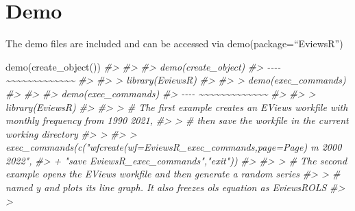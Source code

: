 \documentclass[
]{article}
\newenvironment{Shaded}{\begin{snugshade}}{\end{snugshade}}
\newcommand{\CommentTok}[1]{\textcolor[rgb]{0.56,0.35,0.01}{\textit{#1}}}
\newcommand{\FunctionTok}[1]{\textcolor[rgb]{0.00,0.00,0.00}{#1}}
\newcommand{\NormalTok}[1]{#1}
\begin{document}
\hypertarget{demo}{%
\section{Demo}\label{demo}}

The demo files are included and can be accessed via demo(package=``EviewsR'')

\begin{Shaded}
\begin{Highlighting}[]
\FunctionTok{demo}\NormalTok{(}\FunctionTok{create\_object}\NormalTok{())}
\CommentTok{\#\textgreater{} }
\CommentTok{\#\textgreater{} }
\CommentTok{\#\textgreater{}  demo(create\_object)}
\CommentTok{\#\textgreater{}  {-}{-}{-}{-} \textasciitilde{}\textasciitilde{}\textasciitilde{}\textasciitilde{}\textasciitilde{}\textasciitilde{}\textasciitilde{}\textasciitilde{}\textasciitilde{}\textasciitilde{}\textasciitilde{}\textasciitilde{}\textasciitilde{}}
\CommentTok{\#\textgreater{} }
\CommentTok{\#\textgreater{} \textgreater{} library(EviewsR)}
\CommentTok{\#\textgreater{} }
\CommentTok{\#\textgreater{} \textgreater{} demo(exec\_commands)}
\CommentTok{\#\textgreater{} }
\CommentTok{\#\textgreater{} }
\CommentTok{\#\textgreater{}  demo(exec\_commands)}
\CommentTok{\#\textgreater{}  {-}{-}{-}{-} \textasciitilde{}\textasciitilde{}\textasciitilde{}\textasciitilde{}\textasciitilde{}\textasciitilde{}\textasciitilde{}\textasciitilde{}\textasciitilde{}\textasciitilde{}\textasciitilde{}\textasciitilde{}\textasciitilde{}}
\CommentTok{\#\textgreater{} }
\CommentTok{\#\textgreater{} \textgreater{} library(EviewsR)}
\CommentTok{\#\textgreater{} }
\CommentTok{\#\textgreater{} \textgreater{} \# The first example creates an \textasciigrave{}EViews\textasciigrave{} workfile with monthly frequency from 1990 2021,}
\CommentTok{\#\textgreater{} \textgreater{} \# then save the workfile in the current working directory}
\CommentTok{\#\textgreater{} \textgreater{} }
\CommentTok{\#\textgreater{} \textgreater{} exec\_commands(c("wfcreate(wf=EviewsR\_exec\_commands,page=Page) m 2000 2022",}
\CommentTok{\#\textgreater{} +                 "save EviewsR\_exec\_commands","exit"))}
\CommentTok{\#\textgreater{} }
\CommentTok{\#\textgreater{} \textgreater{} \# The second example opens the \textasciigrave{}EViews\textasciigrave{} workfile and then generate a random series}
\CommentTok{\#\textgreater{} \textgreater{} \# named \textasciigrave{}y\textasciigrave{} and plots its line graph. It also freezes \textasciigrave{}ols\textasciigrave{} equation as \textasciigrave{}EviewsROLS\textasciigrave{}}
\CommentTok{\#\textgreater{} \textgreater{} }

\end{Highlighting}
\end{Shaded}
\end{document}
